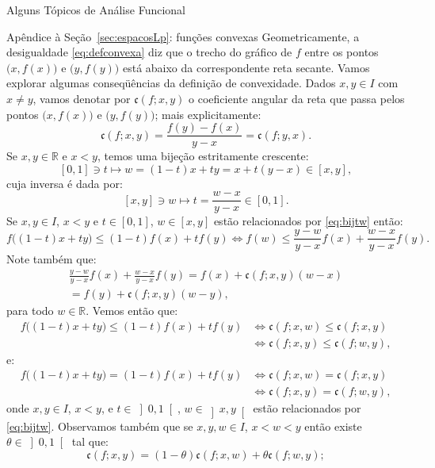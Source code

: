 \documentclass[oneside,final,11pt]{amsbook}
\newcommand{\R}{\mathds R}
\newcommand{\ca}{\mathfrak c}
\theoremstyle{remark}\newtheorem{exercise}{Exercício}[chapter]
\theoremstyle{remark}\newtheorem{*exercise}[exercise]{\hbox to 0pt{\hskip 0pt minus 1fil*}Exercício}
\theoremstyle{definition}\newtheorem{exdefin}{Definição}[chapter]
\theoremstyle{plain}\newtheorem{teo}{Teorema}[section]
\theoremstyle{plain}\newtheorem{lem}[teo]{Lema}
\theoremstyle{plain}\newtheorem{prop}[teo]{Proposição}
\theoremstyle{plain}\newtheorem{cor}[teo]{Corolário}
\theoremstyle{definition}\newtheorem{defin}[teo]{Definição}
\theoremstyle{remark}\newtheorem{rem}[teo]{Observação}
\theoremstyle{definition}\newtheorem{notation}[teo]{Notação}
\theoremstyle{definition}\newtheorem{convention}[teo]{Convenção}
\theoremstyle{definition}\newtheorem{example}[teo]{Exemplo}
\numberwithin{section}{chapter}
\numberwithin{equation}{section}
\begin{document}
\begin{chapter}{Alguns Tópicos de Análise Funcional}
\begin{section}{Apêndice à Seção~\ref{sec:espacosLp}: funções convexas}
Geometricamente, a desigualdade \eqref{eq:defconvexa} diz que o trecho do gráfico de $f$ entre os pontos
$\big(x,f(x)\big)$ e $\big(y,f(y)\big)$ está abaixo da correspondente reta secante.
Vamos explorar algumas conseqüências
da definição de convexidade. Dados $x,y\in I$ com $x\ne y$, vamos denotar por $\ca(f;x,y)$ o
coeficiente angular
da reta que passa pelos pontos $\big(x,f(x)\big)$ e $\big(y,f(y)\big)$; mais explicitamente:\index[simbolos]{$\ca(f;x,y)$}
\[\ca(f;x,y)=\frac{f(y)-f(x)}{y-x}=\ca(f;y,x).\]
Se $x,y\in\R$ e $x<y$, temos uma bijeção estritamente crescente:
\begin{equation}\label{eq:bijtw}
[0,1]\ni t\longmapsto w=(1-t)x+ty=x+t(y-x)\in[x,y],
\end{equation}
cuja inversa é dada por:
\[[x,y]\ni w\longmapsto t=\frac{w-x}{y-x}\in[0,1].\]
Se $x,y\in I$, $x<y$ e $t\in[0,1]$, $w\in[x,y]$ estão relacionados por \eqref{eq:bijtw}
então:
\[f\big((1-t)x+ty\big)\le(1-t)f(x)+tf(y)\Longleftrightarrow
f(w)\le\frac{y-w}{y-x}f(x)+\frac{w-x}{y-x}f(y).\]
Note também que:
\begin{multline}\label{eq:igualdadesfaceis}
\frac{y-w}{y-x}f(x)+\frac{w-x}{y-x}f(y)=f(x)+\ca(f;x,y)(w-x)\\
=f(y)+\ca(f;x,y)(w-y),
\end{multline}
para todo $w\in\R$. Vemos então que:
\begin{equation}\label{eq:equivsca}
\begin{aligned}
f\big((1-t)x+ty\big)\le(1-t)f(x)+tf(y)&\Longleftrightarrow\ca(f;x,w)\le\ca(f;x,y)\\
&\Longleftrightarrow\ca(f;x,y)\le\ca(f;w,y),
\end{aligned}
\end{equation}
e:
\begin{equation}\label{eq:equivsca2}
\begin{aligned}
f\big((1-t)x+ty\big)=(1-t)f(x)+tf(y)&\Longleftrightarrow\ca(f;x,w)=\ca(f;x,y)\\
&\Longleftrightarrow\ca(f;x,y)=\ca(f;w,y),
\end{aligned}
\end{equation}
onde $x,y\in I$, $x<y$, e $t\in\left]0,1\right[$, $w\in\left]x,y\right[$ estão relacionados
por \eqref{eq:bijtw}. Observamos também que se $x,y,w\in I$, $x<w<y$ então existe
$\theta\in\left]0,1\right[$ tal que:
\begin{equation}\label{eq:cacombconvex}
\ca(f;x,y)=(1-\theta)\ca(f;x,w)+\theta\ca(f;w,y);

\end{equation}
\end{section}
\end{chapter}
\end{document}
